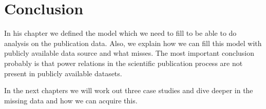 \documentclass{ou-report}
\begin{document}










\section{Conclusion}
In his chapter we defined the model which we need to fill to be able to do 
analysis on the publication data. Also, we explain how we can fill this model
with publicly available data source and what misses. The most important 
conclusion probably is that power relations in the scientific publication 
process are not present in publicly available datasets.

In the next chapters we will work out three case studies and dive deeper in 
the missing data and how we can acquire this.

\end{document}
